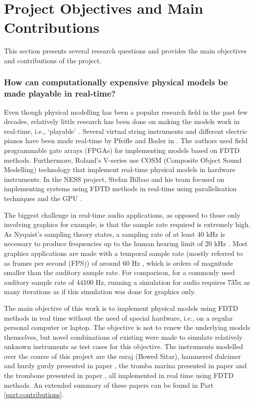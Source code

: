 \section{Project Objectives and Main Contributions}
This section presents several research questions and provides the main objectives and contributions of the project. 

\subsubsection{How can computationally expensive physical models be made playable in real-time?}

Even though physical modelling has been a popular research field in the past few decades, relatively little research has been done on making the models work in real-time, i.e., `playable’ \cite{Mehes2016}. Several virtual string instruments and different electric pianos have been made real-time by Pfeifle and Bader in \cite{Pfeifle2012, Pfeifle2015, Pfeifle2017}. The authors used field programmable gate arrays (FPGAs) for implementing models based on FDTD methods. Furthermore, Roland’s V-series use COSM (Composite Object Sound Modelling) technology \cite{Bybee2019} that implement real-time physical models in hardware instruments. In the NESS project, Stefan Bilbao and his team focused on implementing systems using FDTD methods in real-time using parallelisation techniques and the GPU \cite{Bilbao2019CMJa,Bilbao2019CMJb}. 


The biggest challenge in real-time audio applications, as opposed to those only involving graphics for example, is that the sample rate required is extremely high. As Nyquist's sampling theory states, a sampling rate of at least 40 kHz is necessary to produce frequencies up to the human hearing limit of 20 kHz \cite{Nyquist}. Most graphics applications are made with a temporal sample rate (mostly referred to as frames per second (FPS)) of around 60 Hz \cite{Yantis2016}, which is orders of magnitude smaller than the auditory sample rate. For comparison, for a commonly used auditory sample rate of 44100 Hz, running a simulation for audio requires 735x as many iterations as if this simulation was done for graphics only.  

The main objective of this work is to implement physical models using FDTD methods in real time without the need of special hardware, i.e., on a regular personal computer or laptop. The objective is not to renew the underlying models themselves, but novel combinations of existing were made to simulate relatively unknown instruments as test cases for this objective. The instruments modelled over the course of this project are the esraj (Bowed Sitar), hammered dulcimer and hurdy gurdy presented in paper \citeP[A], the tromba marina presented in paper \citeP[D] and the trombone presented in paper \citeP[H], all implemented in real time using FDTD methods. An extended summary of these papers can be found in Part \ref{part:contributions}.


